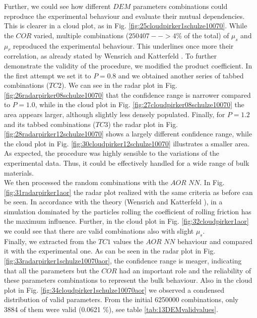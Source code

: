 Further, we could see how different $DEM$ parameters
combinations could reproduce the experimental behaviour and evaluate their mutual dependencies. 
This is clearer in a cloud plot, as in Fig. 
\ref{fig:25cloudpirker1schulze10070}. While the $COR$ varied, multiple
combinations ($250407 --> 4\% $ of the total) of $\mu_s$ and $\mu_r$ reproduced
the experimental behaviour.
This underlines once more their correlation, as already stated by Wensrich and 
Katterfeld \cite{RefWorks:87}.
To further demonstrate the validity of the procedure, we modified the product
coefficient. In the first attempt we set it to $P=0.8$ and we obtained another
series of tabbed combinations ($TC2$).
We can see in the radar plot in Fig.
\ref{fig:26radarpirker08schulze10070} that the confidence range is narrower
compared to $P=1.0$, while in the cloud plot in Fig. 
\ref{fig:27cloudpirker08schulze10070} the area
appears larger, although slightly less densely populated. Finally, for $P=1.2$
and its tabbed combinations ($TC3$) the radar plot in Fig.
\ref{fig:28radarpirker12schulze10070} shows a largely different confidence
range, while the cloud plot in Fig. \ref{fig:30cloudpirker12schulze10070} 
illustrates a smaller area. As expected, the procedure was highly sensible to the variations of the experimental data. 
Thus, it could be effectively handled for a wide range of bulk materials.\\
% 
We then processed the random combinations with the $AOR$ $NN$. In Fig.
\ref{fig:31radarpirker1aor} the radar plot realized with the same criteria as
before can be seen.
In accordance with the theory (Wensrich and Katterfeld \cite{RefWorks:87}), in a simulation dominated
by the particles rolling the coefficient of rolling friction has the maximum influence. 
Further, in the cloud plot in Fig. \ref{fig:32cloudpirker1aor}
we could see that there are valid combinations also with slight $\mu_s$. \\
Finally, we extracted from the $TC1$ values the $AOR$ $NN$ behaviour
and compared it with the experimental one.
As can be seen in the radar plot in Fig.
\ref{fig:33radarpirker1schulze10070aor}, the confidence range is meager, indicating that all the parameters but the $COR$ 
had an important role and the reliability of these parameters combinations to represent the bulk behaviour. 
Also in the cloud plot in Fig. \ref{fig:34cloudpirker1schulze10070aor} we
observed a condensed distribution of valid parameters.
From the initial 6250000 combinations, only 3884 of them were valid (0.0621 \%),
see table \ref{tab:13DEMvalidvalues}.



%
%
%






